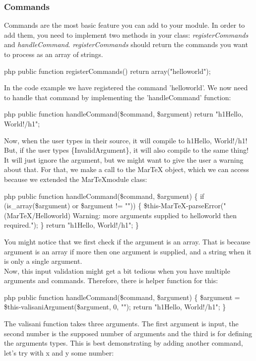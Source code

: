 \subsubsection{Commands}
Commands are the most basic feature you can add to your module. In order to add them, you need to implement two methods in your class: \textit{registerCommands} and \textit{handleCommand}.
\textit{registerCommands} should return the commands you want to process as an array of strings.
\begin{code}{php}
public function registerCommands() {
  return array("helloworld");
}
\end{code}
In the code example we have registered the command 'helloworld'. We now need to handle that command by implementing the 'handleCommand' function:
\begin{code}{php}
public function handleCommand(\$command, \$argument) {
  return "\<h1\>Hello, World!\</h1\>";
}
\end{code}
Now, when the user types \backslashhelloworld in their source, it will compile to \<h1\>Hello, World!\</h1\>! But, if the user types \backslashhelloworld\{InvalidArgument\}, it will also
compile to the same thing! It will just ignore the argument, but we might want to give the user a warning about that. For that, we make a call to the MarTeX object, which we can
access because we extended the MarTeXmodule class:
\begin{code}{php}
public function handleCommand(\$command, \$argument) \{
  if (is_array(\$argument) or \$argument != "")) \{
    \$this-\>MarTeX-\>parseError("(MarTeX/Helloworld) Warning: more arguments supplied to helloworld then required.");
  \}
  return "\<h1\>Hello, World!\</h1\>";
\}
\end{code}
You might notice that we first check if the argument is an array. That is because argument is an array if more then one argument is supplied, and a string when it is only a single argument. \\
Now, this input validation might get a bit tedious when you have multiple arguments and commands. Therefore, there is helper function for this:
\begin{code}{php}
public function handleCommand(\$command, \$argument) \{
  \$argument = \$this-\>valisaniArgument(\$argument, 0, "");
  return "\<h1\>Hello, World!\</h1\>";
\}
\end{code}
The valisani function takes three arguments. The first argument is input, the second number is the supposed number of arguments and the third is for defining the arguments types. This is best demonstrating by adding another command, let's try  with x and y some number:
